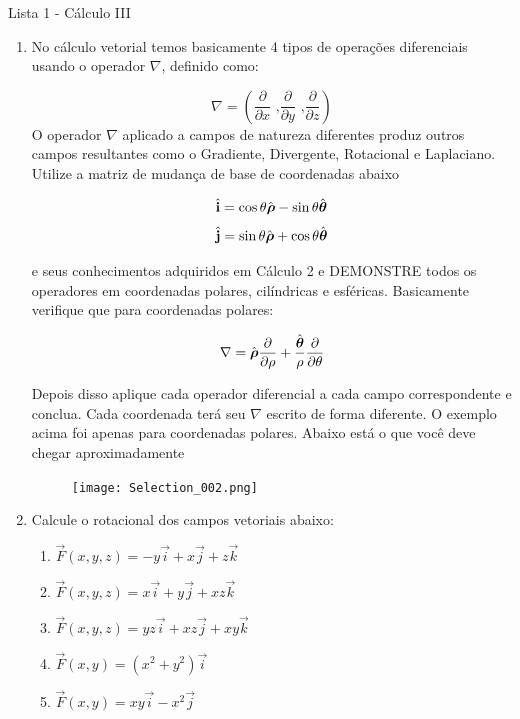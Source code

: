 \documentclass[11pt,a4paper]{article}
\newcommand{\mat}[1]{\mbox{\boldmath{$#1$}}}
\begin{document}
	
	\begin{center}
		\Large Lista 1 - Cálculo III
	\end{center}		
	
	\begin{enumerate}

		\item No cálculo vetorial temos basicamente 4 tipos de operações diferenciais usando o operador
			$\nabla$, definido como:
			
			$$\nabla = \left(\dfrac{\partial }{\partial x} \textrm{\ ,} \dfrac{\partial }{\partial y} \textrm{\ ,}  \dfrac{\partial }{\partial z} \right)$$ 
			O operador $\nabla$ aplicado a campos de natureza diferentes produz outros campos resultantes como o Gradiente, Divergente, Rotacional e Laplaciano. Utilize a matriz de mudança de base de coordenadas abaixo

$$\hat{\textbf{i}} = \cos \theta \hat{\mat{\rho}} - \sin \theta \hat{\mat{\theta}}$$
$$\hat{\textbf{j}} = \sin \theta \hat{\mat{\rho}} + \cos \theta \hat{\mat{\theta}}$$			
			
			 e seus conhecimentos adquiridos em Cálculo 2 e DEMONSTRE todos os operadores em coordenadas polares, cilíndricas e esféricas. Basicamente verifique que para coordenadas polares:
			 
			 $$\nabla = \hat{\mat{\rho}} \dfrac{\partial }{\partial \rho} + \displaystyle\dfrac{\hat{\mat{\theta}}}{\rho} \dfrac{\partial }{\partial \theta} $$
			
			Depois disso aplique cada operador diferencial a cada campo correspondente e conclua. Cada coordenada terá seu $\nabla$ escrito de forma diferente. O exemplo acima foi apenas para coordenadas polares. Abaixo está o que você deve chegar aproximadamente
			
\begin{figure}[h]

\centering %
\texttt{[image: Selection\_002.png]} %
\end{figure}	
	
		\item Calcule o rotacional dos campos vetoriais abaixo:
			\begin{enumerate}
			\item $\overrightarrow{F}(x,y,z) = -y\vec{i} + x\vec{j} + z\vec{k}$
			\item $\overrightarrow{F}(x,y,z) = x\vec{i} + y\vec{j} + xz\vec{k}$
			\item $\overrightarrow{F}(x,y,z) = yz\vec{i} + xz\vec{j} + xy\vec{k}$
			\item $\overrightarrow{F}(x,y) = (x^2 + y^2)\vec{i}$
			\item $\overrightarrow{F}(x,y) = xy\vec{i} - x^2\vec{j}$
			\end{enumerate}
			

\end{enumerate}
\end{document}
